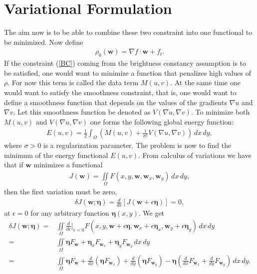 \section{Variational Formulation}
The aim now is to be able to combine these two constraint into one functional to be minimized. Now define 
\begin{align*}
\rho_0(\textbf{w}) = \nabla f \cdot \textbf{w} + f_t.
\end{align*}
If the constraint (\ref{BC}) coming from the brightness constancy assumption is to be satisfied, one would want to minimize a function that penalizes high values of $\rho$. For now this term is called the data term $M(u,v)$. At the same time one would want to satisfy the smoothness constraint, that is, one would want to define a smoothness function that depends on the values of the gradients $\nabla u$ and $\nabla v$. Let this smoothness function be denoted as $V(\nabla u, \nabla v)$. To minimize both $M(u,v)$ and $V(\nabla u, \nabla v)$ one forms the following global energy function:
\begin{align}
\label{OF_funtional}
E(u,v) = \frac{1}{2} \int_\Omega (M(u,v) + \frac{1}{\sigma^2} V(\nabla u, \nabla v)) \, dx \, dy,
\end{align}
where $\sigma > 0$ is a regularization parameter. The problem is now to find the minimum of the energy functional $E(u,v)$. From calculus of variations we have that if $\textbf{w}$ minimizes a functional
\begin{align*}
J(\textbf{w}) = \iint \limits_\Omega F(x,y,\textbf{w},\textbf{w}_x,\textbf{w}_y) \, dx \, dy,
\end{align*} 
then the first variation must be zero,
\begin{align*}
\delta J(\textbf{w};\bm{\eta}) = \frac{d}{d \epsilon} \left[ J(\textbf{w} + \epsilon \bm{\eta}) \right] = 0,
\end{align*}
at $\epsilon = 0$ for any arbitrary function $\bm{\eta}(x,y)$. We get
\begin{align*}
\delta J(\textbf{w};\bm{\eta}) =&  \iint \limits_{\Omega} \frac{d}{d \epsilon}\Big|_{\epsilon = 0} F(x,y,\textbf{w} + \epsilon \bm{\eta}, \textbf{w}_x + \epsilon \bm{\eta}_x, \textbf{w}_y + \epsilon \bm{\eta}_y) \, dx \, dy \\
=&  \iint \limits_{\Omega} \bm{\eta} F_\textbf{w} + \bm{\eta}_x F_{\textbf{w}_x} + \bm{\eta}_y F_{\textbf{w}_y} \, dx \, dy \\
=& \iint \limits_{\Omega} \bm{\eta} F_\textbf{w} + \frac{d}{d x} (\bm{\eta} F_{\textbf{w}_x}) + \frac{d }{d y} (\bm{\eta} F_{\textbf{w}_y}) - \bm{\eta} \left( \frac{d}{d x} F_{\textbf{w}_x} + \frac{d }{d y} F_{\textbf{w}_y} \right) \, dx \, dy.
\end{align*}
